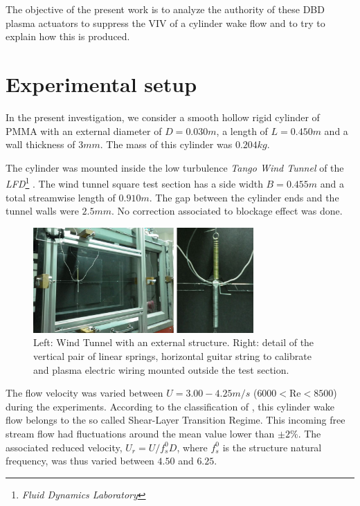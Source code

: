 \documentclass[review]{elsarticle}
\begin{document}
The objective of the present work is to analyze the authority of these DBD plasma actuators to suppress the VIV of a cylinder wake flow and to try to explain how this is produced.

\section{Experimental setup}
\label{sec:Exp}

In the present investigation, we consider a smooth hollow rigid cylinder of PMMA with an external diameter of $D=0.030 m$, a length of $L = 0.450 m$ and a wall thickness of $3mm$. The mass of this cylinder was $0.204 kg$.

The cylinder was mounted inside the low turbulence \textit{Tango Wind Tunnel} of the \textit{LFD}\footnote{\textit{Fluid Dynamics Laboratory}} \citep{dadamo2017}. The wind tunnel square test section has a side width $B = 0.455 m$ and a total streamwise length of $0.910 m$. The gap between the cylinder ends and the tunnel walls were $2.5 mm$. No correction associated to blockage effect was done.

\begin{figure}[h]
\centering
\includegraphics[width=0.75\textwidth]{Figures/Fig_01}
\caption{Left: Wind Tunnel with an external structure. Right: detail of the vertical pair of linear springs, horizontal guitar string to calibrate and plasma electric wiring mounted outside the test section.}
\label{fig:01}
\end{figure}

The flow velocity was varied between  $U= 3.00 - 4.25 m/s$ ($6000<\text{Re}<8500$) during the experiments. According to the classification of \cite{Williamson1996}, this cylinder wake flow belongs to the so called Shear-Layer Transition Regime. This incoming free stream flow had fluctuations around the mean value lower than $\pm 2\%$. The associated reduced velocity, $U_r = U / f_s^0 D$, where $f_s^0$ is the structure natural frequency, was thus varied between $4.50$ and $6.25$. 
\end{document}
